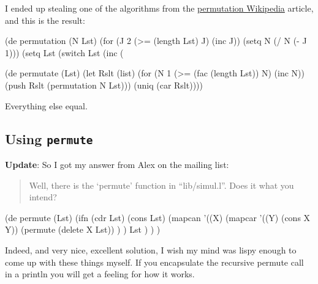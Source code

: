 I ended up stealing one of the algorithms from the
\href{http://en.wikipedia.org/wiki/Permutation}{permutation Wikipedia}
article, and this is the result:


\begin{wideverbatim}
(de permutation (N Lst)
   (for (J 2 (>= (length Lst) J) (inc J))
      (setq N (/ N (- J 1)))
      (setq Lst (switch Lst (inc (%
   
(de permutate (Lst)
   (let Rslt (list)
      (for (N 1 (>= (fac (length Lst)) N) (inc N))
         (push Rslt (permutation N Lst)))
      (uniq (car Rslt))))
\end{wideverbatim}

Everything else equal.

\subsection{Using \texttt{permute}}
\label{sec:fact-perm-recur-using-permute}

\textbf{Update}: So I got my answer from Alex on the mailing list:

\begin{quote}
Well, there is the `permute' function in ``lib/simul.l''. Does it what
you intend?
\end{quote}


\begin{wideverbatim}
(de permute (Lst)
   (ifn (cdr Lst)
      (cons Lst)
      (mapcan
         '((X)
            (mapcar
               '((Y) (cons X Y))
               (permute (delete X Lst)) ) )
         Lst ) ) )
\end{wideverbatim}

Indeed, and very nice, excellent solution, I wish my mind was lispy
enough to come up with these things myself. If you encapsulate the
recursive permute call in a println you will get a feeling for how it
works.
